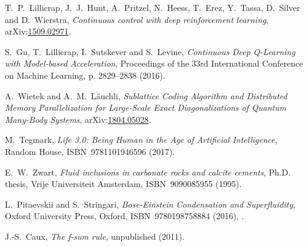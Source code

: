 \documentclass[11pt, a4paper]{report} %
\begin{document}
\begin{thebibliography}{99}
T.~P.~Lillicrap, J.~J.~Hunt, A.~Pritzel, N.~Heess, T.~Erez, Y.~Tassa, D.~Silver and D.~Wierstra, \textit{Continuous control with deep reinforcement learning}, arXiv:\href{https://arxiv.org/abs/1509.02971}{1509.02971}.




S.~Gu, T.~Lillicrap, I.~Sutskever and S.~Levine, \textit{Continuous Deep Q-Learning with Model-based Acceleration}, Proceedings of the 33rd International Conference on Machine Learning, p. 2829--2838 (2016). 



A.~Wietek and A.~M.~Läuchli, \textit{Sublattice Coding Algorithm and Distributed Memory Parallelization for Large-Scale Exact Diagonalizations of Quantum Many-Body Systems}, arXiv:\href{https://arxiv.org/abs/1804.05028}{1804.05028}.




M.~Tegmark, \emph{Life 3.0: Being Human in the Age of Artificial Intelligence}, Random House, ISBN~9781101946596 (2017).



E.~W.~Zwart, \emph{Fluid inclusions in carbonate rocks and calcite cements}, Ph.D. thesis, Vrije Universiteit Amsterdam, ISBN~9090085955 (1995).






L.~Pitaevskii and S.~Stringari, \textit{Bose-Einstein Condensation and Superfluidity}, Oxford University Press, Oxford, ISBN~9780198758884 (2016), .




J.-S.~Caux, \emph{The f-sum rule}, unpublished (2011).





\end{thebibliography}
\end{document}
